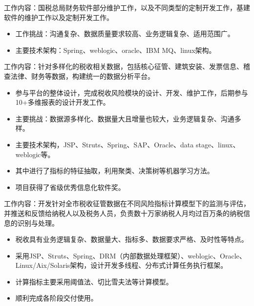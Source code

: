 \documentclass{resume}
\begin{document}
\begin{onehalfspacing}
工作内容：国税总局财务软件部分维护工作，以及不同类型的定制开发工作，基建软件的维护工作以及定制开发工作。
\begin{itemize}
  \item 工作挑战：沟通复杂、数据质量要求较高、业务逻辑复杂、适用范围广。
  \item 主要技术架构：Spring、weblogic、oracle、IBM MQ、linux架构。
\end{itemize}
\end{onehalfspacing}

\begin{onehalfspacing}
工作内容：针对多样化的税收相关数据，包括核心征管、建筑安装、发票信息、稽查法律、财务等数据，构建统一的数据分析平台。
\begin{itemize}
  \item 参与平台的整体设计，完成税收风险模块的设计、开发、维护工作，后期参与10+多维报表的设计开发工作。
  \item 主要挑战：数据源多样化、数据量大且增量也较大，业务逻辑复杂、沟通多样。
  \item 主要技术架构，JSP、Struts、Spring、SAP、Oracle、data stage、linux、weblogic等。
  \item 其中进行了指标的特征抽取，利用聚类、决策树等机器学习方法。
  \item 项目获得了省级优秀信息化软件奖。
\end{itemize}
\end{onehalfspacing}

\begin{onehalfspacing}
工作内容：开发针对全市税收征管数据在不同风险指标计算模型下的监测与评估，并推送和反馈给纳税人以及税务人员，负责数十万家纳税人月均过百万条的纳税信息的识别与处理。
\begin{itemize}
  \item 税收具有业务逻辑复杂、数据量大、指标多、数据要求严格、及时性等特点。
  \item 采用JSP、Struts、Spring、DRM（内部数据处理框架）、weblogic、Oracle、Linux/Aix/Solaris架构，设计开发多线程、分布式计算任务执行框架。
  \item 计算指标主要采用阈值法、切比雪夫法等计算模型。
  \item 顺利完成各阶段交付使用。
\end{itemize}
\end{onehalfspacing}
\end{document}
